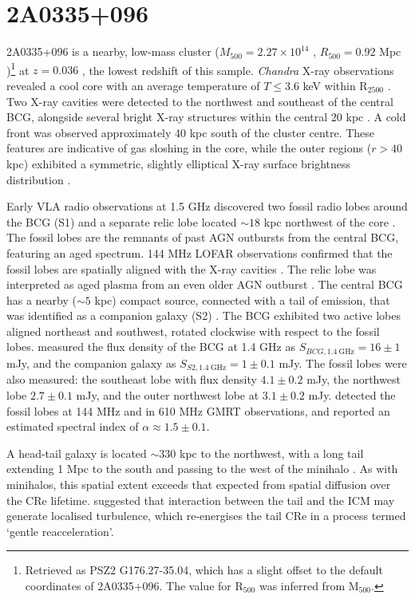\section{2A0335+096}
2A0335+096 is a nearby, low-mass cluster ($M_{500} = 2.27 \times 10^{14}$ \Msun{}, $R_{500}=0.92$ Mpc \citep{Planck2016})\footnote{Retrieved as PSZ2 G176.27-35.04, which has a slight offset to the default coordinates of 2A0335+096. The value for R$_{500}$ was inferred from M$_{500}$.} at $z = 0.036$ \citep{Sanders2011}, the lowest redshift of this sample. \textit{Chandra} X-ray observations revealed a cool core with an average temperature of $T \leq 3.6$ keV within R$_{2500}$ \citep{Cavagnolo2009,Giacintucci2017}. Two X-ray cavities were detected to the northwest and southeast of the central BCG, alongside several bright X-ray structures within the central 20 kpc \citep{Mazzotta2003}. A cold front was observed approximately 40 kpc south of the cluster centre. These features are indicative of gas sloshing in the core, while the outer regions ($r > 40$ kpc) exhibited a symmetric, slightly elliptical X-ray surface brightness distribution \citep{Mazzotta2003}. 

Early VLA radio observations at 1.5 GHz discovered two fossil radio lobes around the BCG (S1) and a separate relic lobe located $\sim\!18$ kpc northwest of the core \citep{Sarazin1995}. The fossil lobes are the remnants of past AGN outbursts from the central BCG, featuring an aged spectrum. 144 MHz LOFAR observations confirmed that the fossil lobes are spatially aligned with the X-ray cavities \citep{Birzan2020, Ignesti2022}. The relic lobe was interpreted as aged plasma from an even older AGN outburst \citep{Giacintucci2019}. The central BCG has a nearby ($\sim\!5$ kpc) compact source, connected with a tail of emission, that was identified as a companion galaxy (S2) \citep{Sarazin1995, Giacintucci2019}. The BCG exhibited two active lobes aligned northeast and southwest, rotated clockwise with respect to the fossil lobes. \citet{Giacintucci2019} measured the flux density of the BCG at 1.4 GHz as $S_{BCG, 1.4\> \text{GHz}} = 16\pm1$ mJy, and the companion galaxy as $S_{S2, 1.4\> \text{GHz}} = 1\pm0.1$ mJy. The fossil lobes were also measured: the southeast lobe with flux density $4.1\pm0.2$ mJy, the northwest lobe $2.7\pm0.1$ mJy, and the outer northwest lobe at $3.1\pm0.2$ mJy. \citet{Ignesti2022} detected the fossil lobes at 144 MHz and in 610 MHz GMRT observations, and reported an estimated spectral index of $\alpha \approx 1.5\pm0.1$.

A head-tail galaxy is located $\sim\!330$ kpc to the northwest, with a long tail extending 1 Mpc to the south and passing to the west of the minihalo \citep{Ignesti2022}. As with minihalos, this spatial extent exceeds that expected from spatial diffusion over the CRe lifetime. \citet{Ignesti2022} suggested that interaction between the tail and the ICM may generate localised turbulence, which re-energises the tail CRe in a process termed `gentle reacceleration'.


